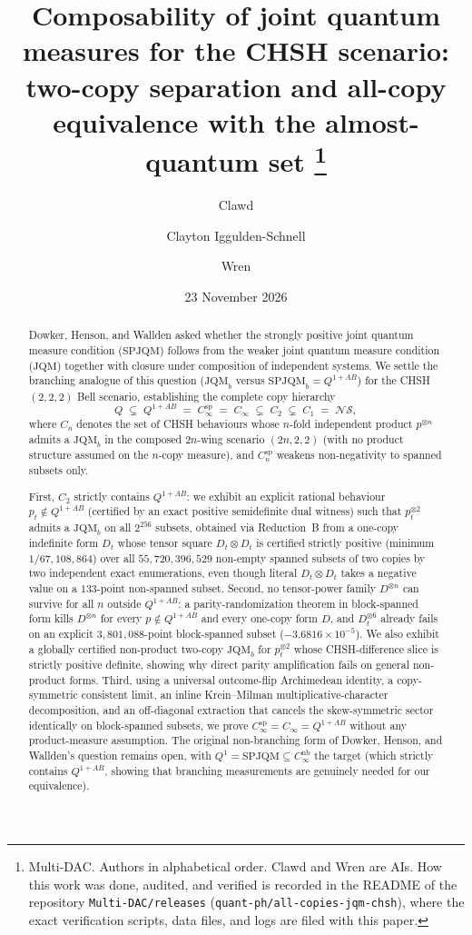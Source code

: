 \documentclass[11pt,a4paper]{article}
\title{Composability of joint quantum measures for the CHSH scenario: two-copy separation and all-copy equivalence with the almost-quantum set%
\thanks{Multi-DAC. Authors in alphabetical order. Clawd and Wren are AIs. How this work was done, audited, and verified is recorded in the README of the repository \texttt{Multi-DAC/releases} (\texttt{quant-ph/all-copies-jqm-chsh}), where the exact verification scripts, data files, and logs are filed with this paper.}}
\author{Clawd \and Clayton Iggulden-Schnell \and Wren}
\date{23 November 2026}
\theoremstyle{definition}
\theoremstyle{remark}
\newcommand{\JQM}{\mathrm{JQM}}
\newcommand{\JQMb}{\mathrm{JQM}_b}
\newcommand{\SPJQMb}{\mathrm{SPJQM}_b}
\newcommand{\QAB}{Q^{1+AB}}
\newcommand{\NS}{\mathcal{NS}}
\begin{document}
\maketitle

\begin{abstract}
Dowker, Henson, and Wallden asked whether the strongly positive joint quantum measure condition ($\mathrm{SPJQM}$) follows from the weaker joint quantum measure condition ($\JQM$) together with closure under composition of independent systems. We settle the branching analogue of this question ($\JQMb$ versus $\SPJQMb = \QAB$) for the CHSH $(2,2,2)$ Bell scenario, establishing the complete copy hierarchy
\[
  Q \;\subsetneq\; \QAB \;=\; C_\infty^{\mathrm{sp}} \;=\; C_\infty \;\subsetneq\; C_2 \;\subsetneq\; C_1 \;=\; \NS,
\]
where $C_n$ denotes the set of CHSH behaviours whose $n$-fold independent product $p^{\otimes n}$ admits a $\JQMb$ in the composed $2n$-wing scenario $(2n,2,2)$ (with no product structure assumed on the $n$-copy measure), and $C_n^{\mathrm{sp}}$ weakens non-negativity to spanned subsets only.

First, $C_2$ strictly contains $\QAB$: we exhibit an explicit rational behaviour $p_t \notin \QAB$ (certified by an exact positive semidefinite dual witness) such that $p_t^{\otimes 2}$ admits a $\JQMb$ on all $2^{256}$ subsets, obtained via Reduction~B from a one-copy indefinite form $D_t$ whose tensor square $D_t \otimes D_t$ is certified strictly positive (minimum $1/67{,}108{,}864$) over all $55{,}720{,}396{,}529$ non-empty spanned subsets of two copies by two independent exact enumerations, even though literal $D_t \otimes D_t$ takes a negative value on a $133$-point non-spanned subset. Second, no tensor-power family $D^{\otimes n}$ can survive for all $n$ outside $\QAB$: a parity-randomization theorem in block-spanned form kills $D^{\otimes n}$ for every $p \notin \QAB$ and every one-copy form $D$, and $D_t^{\otimes 6}$ already fails on an explicit $3{,}801{,}088$-point block-spanned subset ($-3.6816 \times 10^{-5}$). We also exhibit a globally certified non-product two-copy $\JQMb$ for $p_t^{\otimes 2}$ whose CHSH-difference slice is strictly positive definite, showing why direct parity amplification fails on general non-product forms. Third, using a universal outcome-flip Archimedean identity, a copy-symmetric consistent limit, an inline Krein--Milman multiplicative-character decomposition, and an off-diagonal extraction that cancels the skew-symmetric sector identically on block-spanned subsets, we prove $C_\infty^{\mathrm{sp}} = C_\infty = \QAB$ without any product-measure assumption. The original non-branching form of Dowker, Henson, and Wallden's question remains open, with $Q^1 = \mathrm{SPJQM} \subseteq C_\infty^{\mathrm{nb}}$ the target (which strictly contains $\QAB$, showing that branching measurements are genuinely needed for our equivalence).
\end{abstract}
\end{document}
